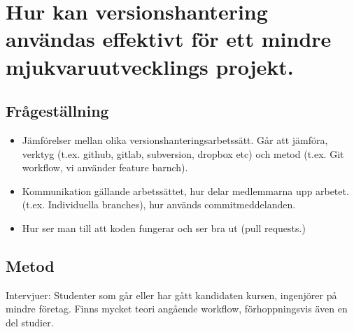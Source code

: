 

\chapter{Hur kan versionshantering användas effektivt för ett mindre mjukvaruutvecklings projekt.}


\vspace{1.5em}
\section{Frågeställning}
\begin{itemize}
    \item Jämförelser mellan olika versionshanteringsarbetssätt. Går att jämföra, verktyg (t.ex. github, gitlab, subversion, dropbox etc) och metod (t.ex. Git workflow, vi använder feature barnch).
    \item Kommunikation gällande arbetssättet, hur delar medlemmarna upp arbetet. (t.ex. Individuella branches), hur används commitmeddelanden.
    \item Hur ser man till att koden fungerar och ser bra ut (pull requests.)
\end{itemize}

\vspace{1.5em}

\section{Metod}
Intervjuer:  Studenter som går eller har gått kandidaten kursen, ingenjörer på mindre företag. Finns mycket teori angående workflow, förhoppningsvis även en del studier.
